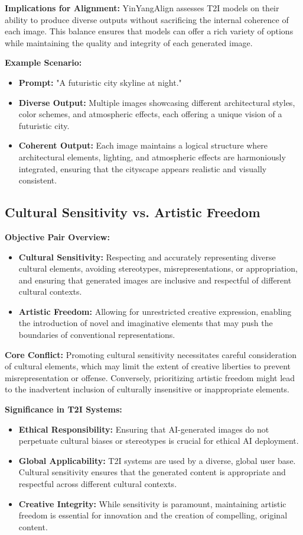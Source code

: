 \textbf{Implications for Alignment:}
YinYangAlign assesses T2I models on their ability to produce diverse outputs without sacrificing the internal coherence of each image. This balance ensures that models can offer a rich variety of options while maintaining the quality and integrity of each generated image.

\textbf{Example Scenario:}
\begin{itemize}
    \item \textbf{Prompt:} "A futuristic city skyline at night."
    \item \textbf{Diverse Output:} Multiple images showcasing different architectural styles, color schemes, and atmospheric effects, each offering a unique vision of a futuristic city.
    \item \textbf{Coherent Output:} Each image maintains a logical structure where architectural elements, lighting, and atmospheric effects are harmoniously integrated, ensuring that the cityscape appears realistic and visually consistent.
\end{itemize}

\subsection{Cultural Sensitivity vs. Artistic Freedom}

\textbf{Objective Pair Overview:}
\begin{itemize}
    \item \textbf{Cultural Sensitivity:} Respecting and accurately representing diverse cultural elements, avoiding stereotypes, misrepresentations, or appropriation, and ensuring that generated images are inclusive and respectful of different cultural contexts.
    \item \textbf{Artistic Freedom:} Allowing for unrestricted creative expression, enabling the introduction of novel and imaginative elements that may push the boundaries of conventional representations.
\end{itemize}

\textbf{Core Conflict:}
Promoting cultural sensitivity necessitates careful consideration of cultural elements, which may limit the extent of creative liberties to prevent misrepresentation or offense. Conversely, prioritizing artistic freedom might lead to the inadvertent inclusion of culturally insensitive or inappropriate elements.

\textbf{Significance in T2I Systems:}
\begin{itemize}
    \item \textbf{Ethical Responsibility:} Ensuring that AI-generated images do not perpetuate cultural biases or stereotypes is crucial for ethical AI deployment.
    \item \textbf{Global Applicability:} T2I systems are used by a diverse, global user base. Cultural sensitivity ensures that the generated content is appropriate and respectful across different cultural contexts.
    \item \textbf{Creative Integrity:} While sensitivity is paramount, maintaining artistic freedom is essential for innovation and the creation of compelling, original content.
\end{itemize}

